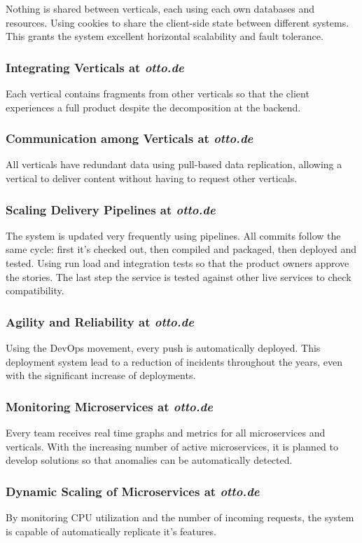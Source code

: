 \documentclass[14pt]{extarticle}
\begin{document}
Nothing is shared between verticals, each using each own databases and resources. Using cookies to share the client-side state between different systems. This grants the system excellent horizontal scalability and fault tolerance.

	\subsubsection{Integrating Verticals at \textit{otto.de}} 
	Each vertical contains fragments from other verticals so that the client experiences a full product despite the decomposition at the backend.
	\subsubsection{Communication among Verticals at \textit{otto.de}}
	All verticals have redundant data using pull-based data replication, allowing a vertical to deliver content without having to request other verticals.
	\subsubsection{Scaling Delivery Pipelines at \textit{otto.de}} 
	The system is updated very frequently using pipelines. All commits follow the same cycle: first it's checked out, then compiled and packaged, then deployed and tested. Using run load and integration tests so that the product owners approve the stories. The last step the service is tested against other live services to check compatibility.
	\subsubsection{Agility and Reliability at \textit{otto.de}} 
	Using the DevOps movement, every push is automatically deployed. This deployment system lead to a reduction of incidents throughout the years, even with the significant increase of deployments.
	\subsubsection{Monitoring Microservices at \textit{otto.de}}
	Every team receives real time graphs and metrics for all microservices and verticals. With the increasing number of active microservices, it is planned to develop solutions so that anomalies can be automatically detected.
	\subsubsection{Dynamic Scaling of Microservices at \textit{otto.de}}
	By monitoring CPU utilization and the number of incoming requests, the system is capable of automatically replicate it's features.
\end{document}
